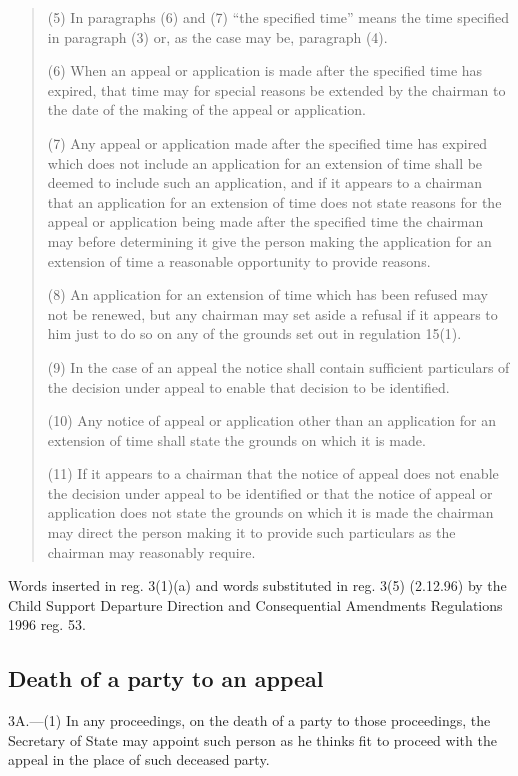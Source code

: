 \documentclass[a4paper]{article}
\begin{document}
{\begin{quotation}
(5) In paragraphs (6) and (7) “the specified time” means the time specified in paragraph (3) or, as the case may be, paragraph (4).

(6) When an appeal or application is made after the specified time has expired, that time may for special reasons be extended by the chairman to the date of the making of the appeal or application.

(7) Any appeal or application made after the specified time has expired which does not include an application for an extension of time shall be deemed to include such an application, and if it appears to a chairman that an application for an extension of time does not state reasons for the appeal or application being made after the specified time the chairman may before determining it give the person making the application for an extension of time a reasonable opportunity to provide reasons.

(8) An application for an extension of time which has been refused may not be renewed, but any chairman may set aside a refusal if it appears to him just to do so on any of the grounds set out in regulation 15(1).

(9) In the case of an appeal the notice shall contain sufficient particulars of the decision under appeal to enable that decision to be identified.

(10) Any notice of appeal or application other than an application for an extension of time shall state the grounds on which it is made.

(11) If it appears to a chairman that the notice of appeal does not enable the decision under appeal to be identified or that the notice of appeal or application does not state the grounds on which it is made the chairman may direct the person making it to provide such particulars as the chairman may reasonably require.
\end{quotation}

Words inserted in reg. 3(1)(a) and words substituted in reg. 3(5) (2.12.96) by the Child Support Departure Direction and Consequential Amendments Regulations 1996 reg. 53.
}

\subsection[3A. Death of a party to an appeal]{Death of a party to an appeal}

3A.—(1) In any proceedings, on the death of a party to those proceedings, the Secretary of State may appoint such person as he thinks fit to proceed with the appeal in the place of such deceased party.
\end{document}
